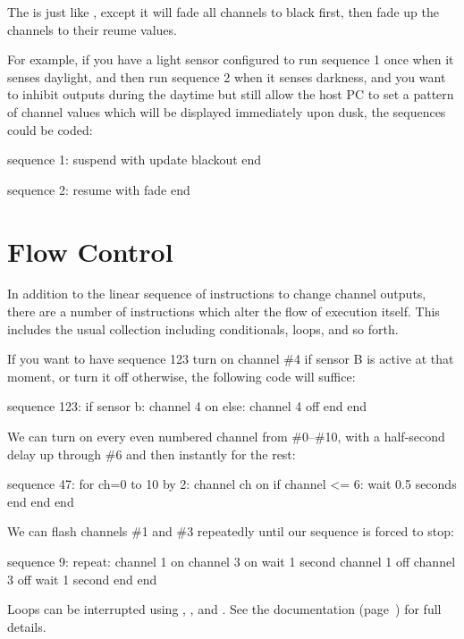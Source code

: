 \documentclass[letterpaper,twoside,onecolumn,openright,final]{memoir}
\begin{document}
{The  is just like , except it will fade all channels to black
first, then fade up the channels to their reume values.

For example, if you have a light sensor configured to run sequence 1 once when it senses daylight,
and then run sequence 2 when it senses darkness, and you want to inhibit outputs during the daytime
but still allow the host PC to set a pattern of channel values which will be displayed immediately
upon dusk, the sequences could be coded:
\begin{SourceCode}
sequence 1:
  suspend with update
  blackout
end

sequence 2:
  resume with fade
end
\end{SourceCode}

\section{Flow Control}
In addition to the linear sequence of instructions to change channel outputs, there are
a number of instructions which alter the flow of execution itself.  This includes the usual
collection including conditionals, loops, and so forth.  

If you want to have sequence 123 turn on channel \#4 if sensor B is active at that moment,
or turn it off otherwise, the following code will suffice:
\begin{SourceCode}
sequence 123:
  if sensor b:
    channel 4 on
  else:
    channel 4 off
  end
end
\end{SourceCode}

We can turn on every even numbered channel from \#0--\#10, with a half-second delay up through \#6
and then instantly for the rest:
\begin{SourceCode}
sequence 47:
  for ch=0 to 10 by 2:
    channel ch on
    if channel <= 6:
      wait 0.5 seconds
    end
  end
end
\end{SourceCode}

We can flash channels \#1 and \#3 repeatedly until our sequence is forced to stop:
\begin{SourceCode}
sequence 9:
  repeat:
    channel 1 on
    channel 3 on
    wait 1 second
    channel 1 off
    channel 3 off
    wait 1 second
  end
end
\end{SourceCode}

Loops can be interrupted using , , and .
See the  documentation (page~\pageref{sh:lumosctl}) for full details.

}
\end{document}
